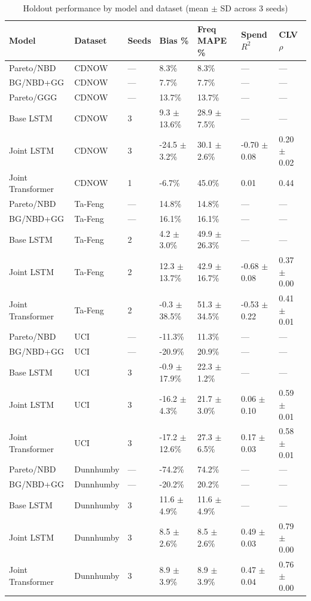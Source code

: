 \begin{table}
\caption{Holdout performance by model and dataset (mean $\pm$ SD across 3 seeds)}
\label{tab:model_comparison_aggregated}
\begin{tabular}{lllllll}
\toprule
Model & Dataset & Seeds & Bias \% & Freq MAPE \% & Spend $R^2$ & CLV $\rho$ \\
\midrule
Pareto/NBD & CDNOW & — & 8.3\% & 8.3\% & — & — \\
BG/NBD+GG & CDNOW & — & 7.7\% & 7.7\% & — & — \\
Pareto/GGG & CDNOW & — & 13.7\% & 13.7\% & — & — \\
Base LSTM & CDNOW & 3 & 9.3 $\pm$ 13.6\% & 28.9 $\pm$ 7.5\% & — & — \\
Joint LSTM & CDNOW & 3 & -24.5 $\pm$ 3.2\% & 30.1 $\pm$ 2.6\% & -0.70 $\pm$ 0.08 & 0.20 $\pm$ 0.02 \\
Joint Transformer & CDNOW & 1 & -6.7\% & 45.0\% & 0.01 & 0.44 \\
Pareto/NBD & Ta-Feng & — & 14.8\% & 14.8\% & — & — \\
BG/NBD+GG & Ta-Feng & — & 16.1\% & 16.1\% & — & — \\
Base LSTM & Ta-Feng & 2 & 4.2 $\pm$ 3.0\% & 49.9 $\pm$ 26.3\% & — & — \\
Joint LSTM & Ta-Feng & 2 & 12.3 $\pm$ 13.7\% & 42.9 $\pm$ 16.7\% & -0.68 $\pm$ 0.08 & 0.37 $\pm$ 0.00 \\
Joint Transformer & Ta-Feng & 2 & -0.3 $\pm$ 38.5\% & 51.3 $\pm$ 34.5\% & -0.53 $\pm$ 0.22 & 0.41 $\pm$ 0.01 \\
Pareto/NBD & UCI & — & -11.3\% & 11.3\% & — & — \\
BG/NBD+GG & UCI & — & -20.9\% & 20.9\% & — & — \\
Base LSTM & UCI & 3 & -0.9 $\pm$ 17.9\% & 22.3 $\pm$ 1.2\% & — & — \\
Joint LSTM & UCI & 3 & -16.2 $\pm$ 4.3\% & 21.7 $\pm$ 3.0\% & 0.06 $\pm$ 0.10 & 0.59 $\pm$ 0.01 \\
Joint Transformer & UCI & 3 & -17.2 $\pm$ 12.6\% & 27.3 $\pm$ 6.5\% & 0.17 $\pm$ 0.03 & 0.58 $\pm$ 0.01 \\
Pareto/NBD & Dunnhumby & — & -74.2\% & 74.2\% & — & — \\
BG/NBD+GG & Dunnhumby & — & -20.2\% & 20.2\% & — & — \\
Base LSTM & Dunnhumby & 3 & 11.6 $\pm$ 4.9\% & 11.6 $\pm$ 4.9\% & — & — \\
Joint LSTM & Dunnhumby & 3 & 8.5 $\pm$ 2.6\% & 8.5 $\pm$ 2.6\% & 0.49 $\pm$ 0.03 & 0.79 $\pm$ 0.00 \\
Joint Transformer & Dunnhumby & 3 & 8.9 $\pm$ 3.9\% & 8.9 $\pm$ 3.9\% & 0.47 $\pm$ 0.04 & 0.76 $\pm$ 0.00 \\
\bottomrule
\end{tabular}
\end{table}

